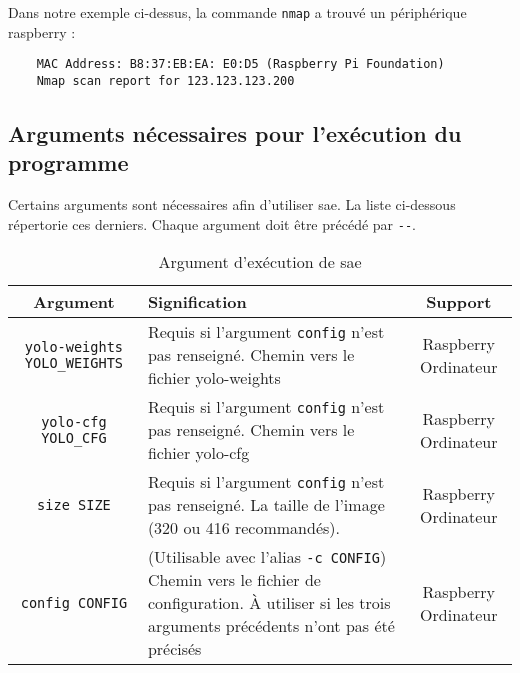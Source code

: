 Dans notre exemple ci-dessus, la commande \texttt{nmap} a trouvé un périphérique \gls{raspberry} :

\begin{verbatim}
    MAC Address: B8:37:EB:EA: E0:D5 (Raspberry Pi Foundation)
    Nmap scan report for 123.123.123.200
\end{verbatim}

\subsection{Arguments nécessaires pour l'exécution du programme}
\label{sec:executionArg_clearWay}
Certains arguments sont nécessaires afin d'utiliser \gls{sae}. La liste ci-dessous répertorie ces derniers.
Chaque argument doit être précédé par \verb=--=.
\begin{table}[H]
    \centering
    \begin{tabularx}{\linewidth}{|c|X|c|}
        \hline
        \rowcolor{tableColorDark} Argument & Signification                                                                                                                                           & Support              \\
        \hline
        \verb=yolo-weights YOLO_WEIGHTS=   & Requis si l'argument \verb=config= n'est pas renseigné. Chemin vers le fichier yolo-weights                                                             & Raspberry Ordinateur \\\hline
        \verb=yolo-cfg YOLO_CFG=           & Requis si l'argument \verb=config= n'est pas renseigné. Chemin vers le fichier yolo-cfg                                                                 & Raspberry Ordinateur \\\hline
        \verb=size SIZE=                   & Requis si l'argument \verb=config= n'est pas renseigné. La taille de l'image (320 ou 416 recommandés).                                                  & Raspberry Ordinateur \\\hline
        \verb=config CONFIG=               & (Utilisable avec l'alias \verb=-c CONFIG=) Chemin vers le fichier de configuration. À utiliser si les trois arguments précédents n'ont pas été précisés & Raspberry Ordinateur \\\hline
    \end{tabularx}
    \label{tab:ArgClearway}
    \caption{Argument d'exécution de \gls{sae}}
\end{table}

